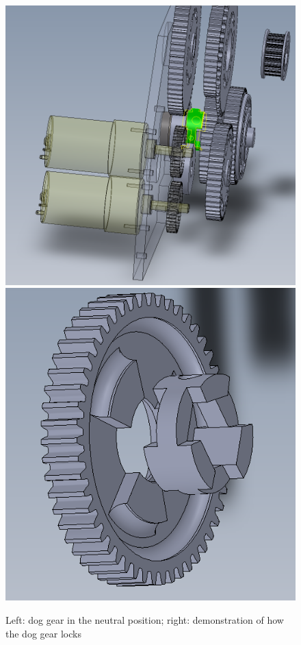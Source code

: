 \begin{figure}[H]
\begin{center}
\includegraphics[scale=0.3]{images/GearboxDog.png}
\includegraphics[scale=0.3]{images/DogGearLock.png}
\end{center}
\caption{Left: dog gear in the neutral position; right: demonstration of how the dog gear locks}
\end{figure}

